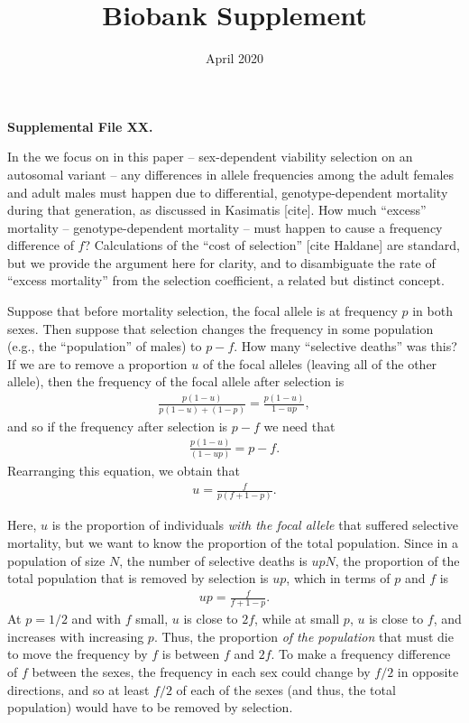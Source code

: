 \documentclass{article}
\title{Biobank Supplement}
\date{April 2020}
\begin{document}
\noindent
\textbf{Supplemental File XX.}

\noindent
In the we focus on in this paper -- sex-dependent viability selection on an autosomal variant --
any differences in allele frequencies among the adult females and adult males
must happen due to differential, genotype-dependent mortality during that generation,
as discussed in Kasimatis [cite].
How much ``excess'' mortality -- genotype-dependent mortality --
must happen to cause a frequency difference of $f$?
Calculations of the ``cost of selection'' [cite Haldane] are standard,
but we provide the argument here for clarity,
and to disambiguate the rate of ``excess mortality'' from the selection coefficient,
a related but distinct concept.

Suppose that before mortality selection, the focal allele is at frequency $p$ in both sexes.
Then suppose that selection changes the frequency in some population (e.g., the ``population'' of males)
to $p - f$.
How many ``selective deaths'' was this?
If we are to remove a proportion $u$ of the focal alleles (leaving all of the other allele),
then the frequency of the focal allele after selection is
\begin{align*}
    \frac{p (1-u)}{p (1-u) + (1 - p)} = \frac{p (1-u)}{1 - u p},
\end{align*}
and so if the frequency after selection is $p-f$ we need that
\begin{align*}
    \frac{p (1-u)}{(1 - u p)} = p - f  .
\end{align*}
Rearranging this equation,
we obtain that
\begin{align*}
    u = \frac{f}{p (f + 1 - p)} .
\end{align*}


Here, $u$ is the proportion of individuals \emph{with the focal allele} that suffered selective mortality, but we want to know the proportion of the total population.
Since in a population of size $N$, the number of selective deaths is $u p N$,
the proportion of the total population that is removed by selection is $u p$,
which in terms of $p$ and $f$ is
\begin{align*}
    u p = \frac{f}{f + 1 - p} .
\end{align*}
At $p = 1/2$ and with $f$ small, $u$ is close to $2 f$,
while at small $p$, $u$ is close to $f$,
and increases with increasing $p$.
Thus, the proportion \emph{of the population} that must die to move the frequency by $f$
is between $f$ and $2 f$.
To make a frequency difference of $f$ between the sexes,
the frequency in each sex could change by $f/2$ in opposite directions,
and so at least $f/2$ of each of the sexes (and thus, the total population)
would have to be removed by selection.
\end{document}
